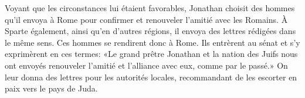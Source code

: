 Voyant que les circonstances lui étaient favorables,
	Jonathan choisit des hommes qu’il envoya à Rome
	pour confirmer et renouveler l’amitié avec les Romains.
À Sparte également, ainsi qu’en d’autres régions,
	il envoya des lettres rédigées dans le même sens.
Ces hommes se rendirent donc à Rome.
Ils entrèrent au sénat et s’y exprimèrent en ces termes:
	«Le grand prêtre Jonathan et la nation des Juifs
	nous ont envoyés renouveler l’amitié et l’alliance avec eux, comme par le passé.»
On leur donna des lettres pour les autorités locales,
	recommandant de les escorter en paix vers le pays de Juda.
